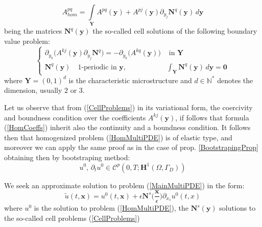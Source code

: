 \begin{equation}
    \label{HomCoeffs}
    A^{pq}_{hom} = \int \limits_{\mathbf{Y}} A^{pq}(\mathbf{y}) + A^{pj} (\mathbf{y}) \partial_{y_j} \mathbf{N}^q (\mathbf{y}) \, d\mathbf{y}
\end{equation}
being the matrices $\mathbf{N}^q(\mathbf{y})$ the so-called cell solutions of the following boundary value problem:
\begin{equation}
    \label{CellProblems}
    \left \{
    \begin{array}{cc}
        \partial_{y_k} \big( A^{kj}(\mathbf{y}) \partial_{y_j} \mathbf{N}^q \big) = -\partial_{y_k} \big( A^{kq}(\mathbf{y}) \big) & \text{ in } \mathbf{Y} \\
        \mathbf{N}^q(\mathbf{y}) \quad 1\text{-periodic in } \mathbf{y}, & \int_{\mathbf{Y}}  \mathbf{N}^q (\mathbf{y}) \, d\mathbf{y} = \mathbf{0}
    \end{array}
    \right .
\end{equation}
where $\mathbf{Y} = (0,1)^d$ is the characteristic microstructure and $d \in \mathbb{N}^*$ denotes the dimension, usually $2$ or $3$.\\

\begin{rem}
 Let us observe that from (\ref{CellProblems}) in its variational form, the coercivity and boundness condition over the coefficients $A^{kj}(\mathbf{y})$, if follows that formula (\ref{HomCoeffs}) inherit also the continuity and a boundness condition. It follows then that homogenized problem (\ref{HomMultiPDE}) is of elastic type, and moreover we can apply the same proof as in the case of prop. \ref{BootstrapingProp} obtaining then by bootstraping method:
 \begin{equation*}
     u^0, \, \partial_{t} u^0 \in \mathcal{C}^p (0,T; \mathbf{H}^1(\Omega, \Gamma_D))
 \end{equation*}
\end{rem}

We seek an approximate solution to problem (\ref{MainMultiPDE}) in the form:
\begin{equation}
    \label{Asymptotic}
    \tilde{u}(t,\mathbf{x}) = u^0 (t,\mathbf{x}) + \epsilon \mathbf{N}^{s} \big(\frac{\mathbf{x}}{\epsilon} \big) \partial_{x_s} u^0(t,x)
\end{equation}
where $u^0$ is the solution to problem (\ref{HomMultiPDE}), the $\mathbf{N}^{s} (\mathbf{y})$ solutions to the so-called cell problems (\ref{CellProblems})


